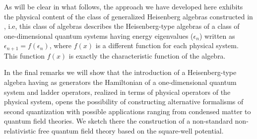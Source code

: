 \documentclass[a4paper,12pt]{article}
\begin{document}
As will
be clear in what follows, the approach we have developed
here exhibits the physical content of the class of generalized
Heisenberg algebras constructed in \cite{algebra2}, i.e,
this class of algebras describes the Heisenberg-type
algebras of a class of one-dimensional quantum systems 
having energy eigenvalues ($\epsilon_{n}$) written as 
$\epsilon_{n+1} = f(\epsilon_{n})$, where 
$f(x)$ is a different function for each physical
system. This function $f(x)$ is exactly the 
characteristic function of the algebra.
 
In the final remarks we will show that 
the introduction of a Heisenberg-type algebra having
as generators the Hamiltonian of a one-dimensional
quantum system and ladder operators, 
realized in terms of physical operators of the physical 
system, opens the possibility of constructing alternative 
formalisms of second quantization with possible applications
ranging from condensed matter to quantum field theories. 
We sketch there the construction of a non-standard 
non-relativistic free quantum field theory based
on the square-well potential.
\end{document}

